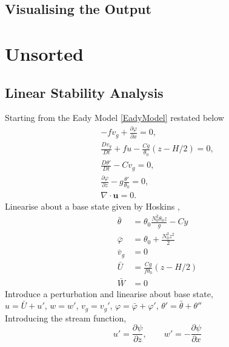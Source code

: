 
\section{Visualising the Output \label{plotting}}

\chapter{Unsorted}
\section{Linear Stability Analysis}
Starting from the Eady Model \ref{EadyModel} restated below
\begin{equation}
	\begin{aligned}
	-fv_g + \frac{\partial \varphi}{\partial x} = 0,\\
	\frac{Dv_g}{Dt} + fu -\frac{Cg}{\theta _0}\left(z-H/2\right) = 0,\\
	\frac{D\theta'}{Dt} - Cv_g = 0,\\
	\frac{\partial \varphi}{\partial z} - g\frac{\theta'}{\theta_0} = 0,\\
	\nabla \cdot \bm{u} = 0.
	\end{aligned}
\label{EadyModel2}
\end{equation} 
Linearise about a base state given by Hoskins \cite{Hoskins1975},
\begin{equation}
	\begin{aligned}
		\bar{\theta} &= \theta_0 \frac{N_0^2\theta_0 z}{g} - Cy \\
		\bar{\varphi} &= \theta_0 + \frac{N_0^2 z^2}{2}\\
		\bar{v}_g &= 0\\
		\bar{U} &= \frac{Cg}{f\theta_0}\left(z - H/2\right)\\
		\bar{W} &= 0 
	\end{aligned}
\end{equation}
Introduce a perturbation and linearise about base state,\\
$u = \bar{U} + u'$, $w = w'$, $v_g =  v_g'$, $\varphi = \bar{\varphi} + \varphi'$, $\theta ' = \bar{\theta} + \theta ''$\\
Introducing the stream function,
\begin{equation}
	u' = \frac{\partial \psi}{\partial z},\qquad w' = -\frac{\partial \psi}{\partial x} 
\end{equation}
